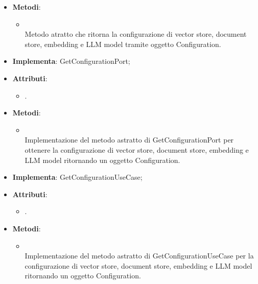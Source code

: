 \documentclass[10pt, a4paper]{article}
\begin{document}
\label{GetConfigurationPortDettaglio}
\begin{itemize}
    \item \textbf{Metodi}:
    \begin{itemize}
        \item {}\\
        Metodo atratto che ritorna la configurazione di vector store, document store, embedding e LLM model tramite oggetto Configuration.
    \end{itemize}
\end{itemize}


\label{GetConfigurationPostgresDettaglio}
\begin{itemize}
    \item \textbf{Implementa}: GetConfigurationPort;
    \item \textbf{Attributi}:
    \begin{itemize}
        \item {}.  
    \end{itemize}
    \item \textbf{Metodi}:
    \begin{itemize}
        \item {}\\
        Implementazione del metodo astratto di GetConfigurationPort per ottenere la configurazione di vector store, document store, embedding e LLM model ritornando un oggetto Configuration.
    \end{itemize}
\end{itemize}


\label{GetConfigurationServiceDettaglio}
\begin{itemize}
    \item \textbf{Implementa}: GetConfigurationUseCase;
    \item \textbf{Attributi}:
    \begin{itemize}
        \item {}.  
    \end{itemize}
    \item \textbf{Metodi}:
    \begin{itemize}
        \item {}\\
        Implementazione del metodo astratto di GetConfigurationUseCase per la configurazione di vector store, document store, embedding e LLM model ritornando un oggetto Configuration.
    \end{itemize}
\end{itemize}
\end{document}
